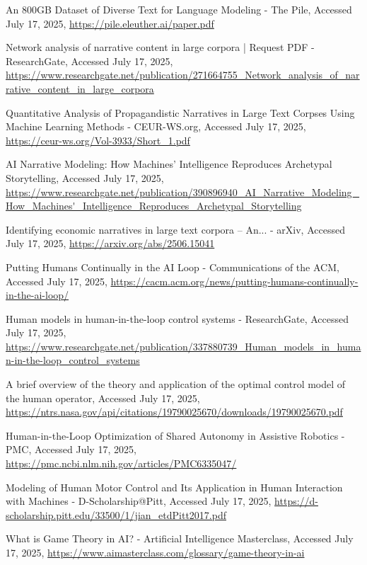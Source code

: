 \documentclass[10pt,twocolumn]{article}
\begin{document}
\begin{thebibliography}{68}
An 800GB Dataset of Diverse Text for Language Modeling - The Pile, Accessed July 17, 2025, \url{https://pile.eleuther.ai/paper.pdf}

Network analysis of narrative content in large corpora | Request PDF - ResearchGate, Accessed July 17, 2025, \url{https://www.researchgate.net/publication/271664755_Network_analysis_of_narrative_content_in_large_corpora}

Quantitative Analysis of Propagandistic Narratives in Large Text Corpses Using Machine Learning Methods - CEUR-WS.org, Accessed July 17, 2025, \url{https://ceur-ws.org/Vol-3933/Short_1.pdf}

AI Narrative Modeling: How Machines' Intelligence Reproduces Archetypal Storytelling, Accessed July 17, 2025, \url{https://www.researchgate.net/publication/390896940_AI_Narrative_Modeling_How_Machines'_Intelligence_Reproduces_Archetypal_Storytelling}

Identifying economic narratives in large text corpora -- An... - arXiv, Accessed July 17, 2025, \url{https://arxiv.org/abs/2506.15041}

Putting Humans Continually in the AI Loop - Communications of the ACM, Accessed July 17, 2025, \url{https://cacm.acm.org/news/putting-humans-continually-in-the-ai-loop/}

Human models in human-in-the-loop control systems - ResearchGate, Accessed July 17, 2025, \url{https://www.researchgate.net/publication/337880739_Human_models_in_human-in-the-loop_control_systems}

A brief overview of the theory and application of the optimal control model of the human operator, Accessed July 17, 2025, \url{https://ntrs.nasa.gov/api/citations/19790025670/downloads/19790025670.pdf}

Human-in-the-Loop Optimization of Shared Autonomy in Assistive Robotics - PMC, Accessed July 17, 2025, \url{https://pmc.ncbi.nlm.nih.gov/articles/PMC6335047/}

Modeling of Human Motor Control and Its Application in Human Interaction with Machines - D-Scholarship@Pitt, Accessed July 17, 2025, \url{https://d-scholarship.pitt.edu/33500/1/jian_etdPitt2017.pdf}

What is Game Theory in AI? - Artificial Intelligence Masterclass, Accessed July 17, 2025, \url{https://www.aimasterclass.com/glossary/game-theory-in-ai}


\end{thebibliography}
\end{document}
